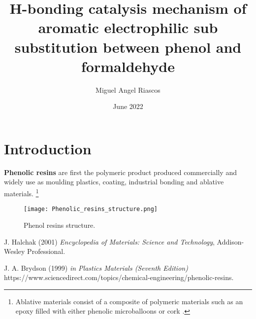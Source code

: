 \documentclass{article}
\title{H-bonding catalysis mechanism of aromatic electrophilic sub
substitution between phenol and formaldehyde}
\author{Miguel Angel Riascos }
\date{June 2022}
\begin{document}
\maketitle

\section{Introduction}

\textbf{Phenolic resins} are first the polymeric product produced commercially \cite{phenolresins} and widely use as moulding plastics, coating, industrial bonding and ablative materials. \footnote {Ablative materials consist of a composite of polymeric materials such as an epoxy filled with either phenolic microballoons or cork \cite{ablative}.}



\begin{figure}[h]
    \centering
 	\texttt{[image: Phenolic\_resins\_structure.png]}
    \caption{Phenol resins structure.}
    \label{fig:mesh1}
\end{figure}

\begin{thebibliography}{9}
J. Halchak (2001) \emph{Encyclopedia of Materials: Science and Technology},  Addison-Wesley Professional.

J. A. Brydson (1999) \emph{in Plastics Materials (Seventh Edition)} https://www.sciencedirect.com/topics/chemical-engineering/phenolic-resins.
\end{thebibliography}
\end{document}
